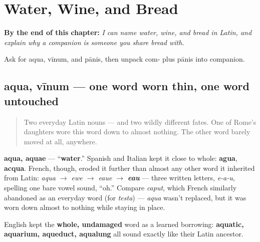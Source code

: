 
\chapter{Water, Wine, and Bread}
\label{ch:la-water-wine-bread}

\begin{chapteropening}
\textbf{By the end of this chapter:} \emph{I can name water, wine, and bread in Latin, and explain why a companion is someone you share bread with.}

Ask for aqua, vīnum, and pānis, then unpack com- plus pānis into companion.
\end{chapteropening}

\section[aqua, vīnum]{aqua, vīnum — one word worn thin, one word untouched}

\label{lesson:LA-C10-aqua-vinum}



\begin{quote}
Two everyday Latin nouns — and two wildly different fates. One of Rome's daughters wore this word down to almost nothing. The other word barely moved at all, anywhere.
\end{quote}

\begin{cousinweb}
\textbf{aqua, aquae} — \textquotedblleft{}\textbf{water}.\textquotedblright{} Spanish and Italian kept it close to whole: \textbf{agua}, \textbf{acqua}. French, though, eroded it further than almost any other word it inherited from Latin: \emph{aqua $\to$ ewe $\to$ eaue $\to$ \textbf{eau}} — three written letters, \emph{e-a-u}, spelling one bare vowel sound, \textquotedblleft{}oh.\textquotedblright{} Compare \emph{caput}, which French similarly abandoned as an everyday word (for \emph{testa}) — \emph{aqua} wasn't replaced, but it was worn down almost to nothing while staying in place.

English kept the \textbf{whole, undamaged} word as a learned borrowing: \textbf{aquatic, aquarium, aqueduct, aqualung} all sound exactly like their Latin ancestor.
\end{cousinweb}

